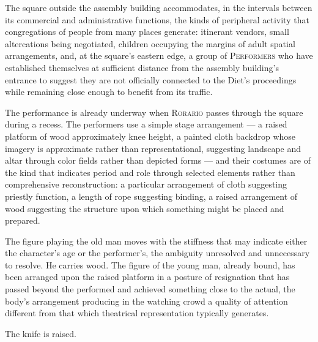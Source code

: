 \documentclass[12pt, oneside]{article}
\newcommand{\sceneheading}[1]{%
  \vspace{1.8em}%
  \noindent{\bfseries\large\MakeUppercase{#1}}%
  \vspace{0.6em}%
  \par\noindent{\color{rulecolor}\rule{\linewidth}{0.3pt}}%
  \vspace{0.5em}\par%
}
\newenvironment{action}{%
  \vspace{0.6em}%
  \noindent\ignorespaces%
}{%
  \par\vspace{0.6em}%
}
\begin{document}
\sceneheading{EXT. Market Square, Regensburg — Afternoon}

\begin{action}
The square outside the assembly building accommodates, in the intervals between its commercial and administrative functions, the kinds of peripheral activity that congregations of people from many places generate: itinerant vendors, small altercations being negotiated, children occupying the margins of adult spatial arrangements, and, at the square's eastern edge, a group of \textsc{Performers} who have established themselves at sufficient distance from the assembly building's entrance to suggest they are not officially connected to the Diet's proceedings while remaining close enough to benefit from its traffic.

The performance is already underway when \textsc{Rorario} passes through the square during a recess. The performers use a simple stage arrangement --- a raised platform of wood approximately knee height, a painted cloth backdrop whose imagery is approximate rather than representational, suggesting landscape and altar through color fields rather than depicted forms --- and their costumes are of the kind that indicates period and role through selected elements rather than comprehensive reconstruction: a particular arrangement of cloth suggesting priestly function, a length of rope suggesting binding, a raised arrangement of wood suggesting the structure upon which something might be placed and prepared.

The figure playing the old man moves with the stiffness that may indicate either the character's age or the performer's, the ambiguity unresolved and unnecessary to resolve. He carries wood. The figure of the young man, already bound, has been arranged upon the raised platform in a posture of resignation that has passed beyond the performed and achieved something close to the actual, the body's arrangement producing in the watching crowd a quality of attention different from that which theatrical representation typically generates.

The knife is raised.
\end{action}
\end{document}
